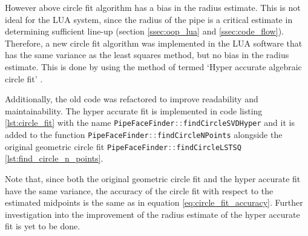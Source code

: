 However above circle fit algorithm has a bias in the radius estimate. This is not ideal for the LUA system, since the radius of the pipe is a critical estimate in determining sufficient line-up (section \ref{ssec:oop_lua} and \ref{ssec:code_flow}). Therefore, a new circle fit algorithm was implemented in the LUA software that has the same variance as the least squares method, but no bias in the radius estimate. This is done by using the method of \citeauthor{alsharadqah_chernov_circle_fitting} termed `Hyper accurate algebraic circle fit' \cite{alsharadqah_chernov_circle_fitting}. 

Additionally, the old code was refactored to improve readability and maintainability. The hyper accurate fit is implemented in code listing \ref{lst:circle_fit} with the name \lstinline[language=C]|PipeFaceFinder::findCircleSVDHyper| and it is added to the function \lstinline[language=C]|PipeFaceFinder::findCircleNPoints| alongside the original geometric circle fit \lstinline[language=C]|PipeFaceFinder::findCircleLSTSQ| \ref{lst:find_circle_n_points}. 

Note that, since both the original geometric circle fit and the hyper accurate fit have the same variance, the accuracy of the circle fit with respect to the estimated midpoints is the same as in equation \ref{eq:circle_fit_accuracy}. Further investigation into the improvement of the radius estimate of the hyper accurate fit is yet to be done.